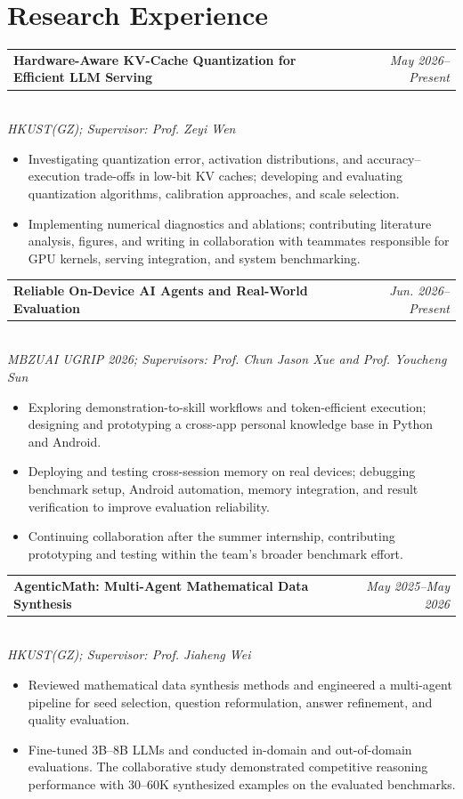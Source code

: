 \documentclass[10pt,a4paper]{article}
\makeatletter
\newcommand{\entry}[3]{%
  \begin{tabularx}{\textwidth}{@{}Xr@{}}
    \textbf{#1} & \textit{#2}
  \end{tabularx}\\[-1pt]
  \textit{#3}
}
\makeatother
\begin{document}
\section*{Research Experience}
\entry{Hardware-Aware KV-Cache Quantization for Efficient LLM Serving}{May 2026--Present}
{HKUST(GZ); Supervisor: Prof. Zeyi Wen}
\begin{itemize}
  \item Investigating quantization error, activation distributions, and accuracy--execution trade-offs in low-bit KV caches; developing and evaluating quantization algorithms, calibration approaches, and scale selection.
  \item Implementing numerical diagnostics and ablations; contributing literature analysis, figures, and writing in collaboration with teammates responsible for GPU kernels, serving integration, and system benchmarking.
\end{itemize}
\entry{Reliable On-Device AI Agents and Real-World Evaluation}{Jun. 2026--Present}
{MBZUAI UGRIP 2026; Supervisors: Prof. Chun Jason Xue and Prof. Youcheng Sun}
\begin{itemize}
  \item Exploring demonstration-to-skill workflows and token-efficient execution; designing and prototyping a cross-app personal knowledge base in Python and Android.
  \item Deploying and testing cross-session memory on real devices; debugging benchmark setup, Android automation, memory integration, and result verification to improve evaluation reliability.
  \item Continuing collaboration after the summer internship, contributing prototyping and testing within the team's broader benchmark effort.
\end{itemize}
\entry{AgenticMath: Multi-Agent Mathematical Data Synthesis}{May 2025--May 2026}
{HKUST(GZ); Supervisor: Prof. Jiaheng Wei}
\begin{itemize}
  \item Reviewed mathematical data synthesis methods and engineered a multi-agent pipeline for seed selection, question reformulation, answer refinement, and quality evaluation.
  \item Fine-tuned 3B--8B LLMs and conducted in-domain and out-of-domain evaluations. The collaborative study demonstrated competitive reasoning performance with 30--60K synthesized examples on the evaluated benchmarks.
\end{itemize}
\end{document}
